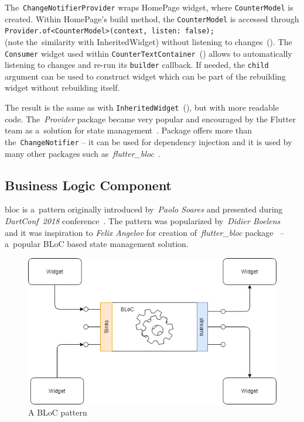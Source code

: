 The~\verb|ChangeNotifierProvider| wraps HomePage widget, where \verb|CounterModel| is created. Within HomePage's build method, the \verb|CounterModel| is accessed through \verb|Provider.of<CounterModel>(context, listen: false);| \\(note the~similarity with InheritedWidget) without listening to changes~(). The \verb|Consumer| widget used within \verb|CounterTextContainer|~() allows to automatically listening to changes and re-run its \verb|builder| callback. If needed, the \verb|child| argument can be used to construct widget which can be part of the rebuilding widget without rebuilding itself. 

The result is the same as with \verb|InheritedWidget|~(), but with more readable code. The~\textit{Provider} package became very popular and encouraged by the Flutter team as a~solution for state management~\cite{flutter-simple-state-management}. Package offers more than the~\verb|ChangeNotifier| -- it can be used for dependency injection and it is used by many other packages such as~\textit{flutter\_bloc}~\cite{package-bloc}.
\subsection{Business Logic Component}
\gls{bloc} is a~pattern originally introduced by~\textit{Paolo Soares} and presented during \textit{DartConf~2018} conference~\cite{bloc-pattern-youtube}. The pattern was popularized by~\textit{Didier Boelens}~\cite{reactive-didier} and it was inspiration to \textit{Felix Angelov} for creation of~\textit{flutter\_bloc} package~\cite{package-bloc} -- a~popular BLoC based state management solution.

\begin{figure}[ht]
    \centering
    \includegraphics[width=0.6\linewidth]{img/flutter/bloc_pattern.png}
    \caption{A BLoC pattern~\cite{notion-widget-didier}}
    \label{fig:bloc-pattern}
\end{figure}

